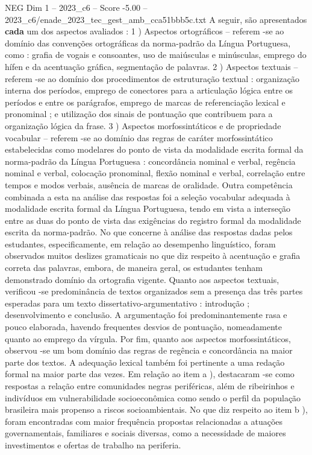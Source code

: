 \begin{textsample}{NEG Dim 1 – 2023\_c6 – Score -5.00 – 2023\_c6/enade\_2023\_tec\_gest\_amb\_cca51bbb5c.txt}
A seguir, são apresentados \textbf{cada} um dos aspectos avaliados : 1 ) Aspectos ortográficos – referem -se ao domínio das convenções ortográficas da norma-padrão da Língua Portuguesa, como : grafia de vogais e consoantes, uso de maiúsculas e minúsculas, emprego do hífen e da acentuação gráfica, segmentação de palavras. 2 ) Aspectos textuais – referem -se ao domínio dos procedimentos de estruturação textual : organização interna dos períodos, emprego de conectores para a articulação lógica entre os períodos e entre os parágrafos, emprego de marcas de referenciação lexical e pronominal ; e utilização dos sinais de pontuação que contribuem para a organização lógica da frase. 3 ) Aspectos morfossintáticos e de propriedade vocabular – referem -se ao domínio das regras de caráter morfossintático estabelecidas como modelares do ponto de vista da modalidade escrita formal da norma-padrão da Língua Portuguesa : concordância nominal e verbal, regência nominal e verbal, colocação pronominal, flexão nominal e verbal, correlação entre tempos e modos verbais, ausência de marcas de oralidade.
Outra competência combinada a esta na análise das respostas foi a seleção vocabular adequada à modalidade escrita formal da Língua Portuguesa, tendo em vista a interseção entre as duas do ponto de vista das exigências do registro formal da modalidade escrita da norma-padrão.
No que concerne à análise das respostas dadas pelos estudantes, especificamente, em relação ao desempenho linguístico, foram observados muitos deslizes gramaticais no que diz respeito à acentuação e grafia correta das palavras, embora, de maneira geral, os estudantes tenham demonstrado domínio da ortografia vigente.
Quanto aos aspectos textuais, verificou -se predominância de textos organizados sem a presença das três partes esperadas para um texto dissertativo-argumentativo : introdução ; desenvolvimento e conclusão.
A argumentação foi predominantemente rasa e pouco elaborada, havendo frequentes desvios de pontuação, nomeadamente quanto ao emprego da vírgula.
Por fim, quanto aos aspectos morfossintáticos, observou -se um bom domínio das regras de regência e concordância na maior parte dos textos.
A adequação lexical também foi pertinente a uma redação formal na maior parte das vezes.
Em relação ao item a ), destacaram -se como respostas a relação entre comunidades negras periféricas, além de ribeirinhos e indivíduos em vulnerabilidade socioeconômica como sendo o perfil da população brasileira mais propenso a riscos socioambientais.
No que diz respeito ao item b ), foram encontradas com maior frequência propostas relacionadas a atuações governamentais, familiares e sociais diversas, como a necessidade de maiores investimentos e ofertas de trabalho na periferia.

\end{textsample}
